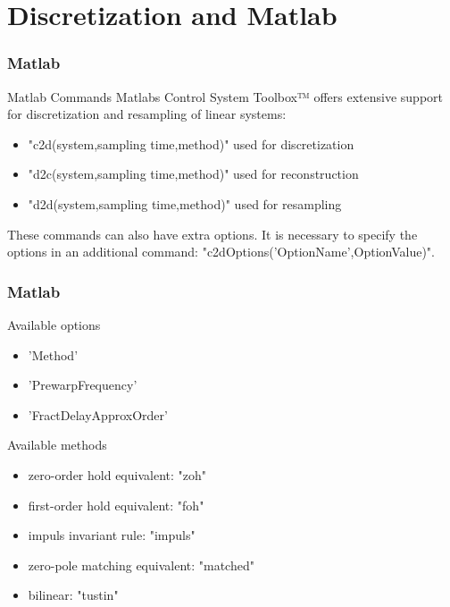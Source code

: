 \section{Discretization and Matlab}

\begin{frame}
	\frametitle{Matlab}
	\begin{block}{Matlab Commands}
		Matlabs Control System Toolbox™ offers extensive support for discretization and resampling of linear systems:
	\begin{itemize}
		\item "c2d(system,sampling time,method)" used for discretization
		\item "d2c(system,sampling time,method)" used for reconstruction
		\item "d2d(system,sampling time,method)" used for resampling
	\end{itemize}
	\vspace{1em}
		These commands can also have extra options. It is necessary to specify the options in an additional command:
		"c2dOptions('OptionName',OptionValue)".
	\end{block}
\end{frame}

\begin{frame}
	\frametitle{Matlab}
	\begin{block}{Available options}
		\begin{itemize}
			\item 'Method'
			\item 'PrewarpFrequency'
			\item 'FractDelayApproxOrder'
		\end{itemize}
	\end{block}
	
	\begin{block}{Available methods}
		\begin{itemize}
			\item zero-order hold equivalent: "zoh"
			\item first-order hold equivalent: "foh"
			\item impuls invariant rule: "impuls"
			\item zero-pole matching equivalent: "matched"
			\item bilinear: "tustin"
		\end{itemize}
	\end{block}
\end{frame}

